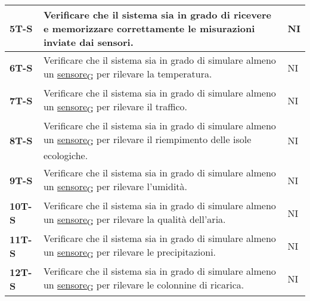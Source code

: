 \begin{longtable}{|>{\raggedright\arraybackslash}m{}|>{\raggedright\arraybackslash}m{}|>{\raggedright\arraybackslash}m{}|}
	\hline
	\textbf{5T-S}   & Verificare che il sistema sia in grado di ricevere e memorizzare correttamente le misurazioni inviate dai sensori.                                                                               & NI             \\
	\hline
	\textbf{6T-S}   & Verificare che il sistema sia in grado di simulare almeno un \href{https://7last.github.io/docs/pb/documentazione-interna/glossario\#sensore}{sensore\textsubscript{G}} per rilevare la temperatura.                                                                                                & NI             \\
	\hline
	\textbf{7T-S}   & Verificare che il sistema sia in grado di simulare almeno un \href{https://7last.github.io/docs/pb/documentazione-interna/glossario\#sensore}{sensore\textsubscript{G}} per rilevare il traffico.                                                                                                   & NI             \\
	\hline
	\textbf{8T-S}   & Verificare che il sistema sia in grado di simulare almeno un \href{https://7last.github.io/docs/pb/documentazione-interna/glossario\#sensore}{sensore\textsubscript{G}} per rilevare il riempimento delle isole ecologiche.                                                                         & NI             \\
	\hline
	\textbf{9T-S}   & Verificare che il sistema sia in grado di simulare almeno un \href{https://7last.github.io/docs/pb/documentazione-interna/glossario\#sensore}{sensore\textsubscript{G}} per rilevare l'umidità.                                                                                                     & NI             \\
	\hline
	\textbf{10T-S}  & Verificare che il sistema sia in grado di simulare almeno un \href{https://7last.github.io/docs/pb/documentazione-interna/glossario\#sensore}{sensore\textsubscript{G}} per rilevare la qualità dell'aria.                                                                                          & NI             \\
	\hline
	\textbf{11T-S}  & Verificare che il sistema sia in grado di simulare almeno un \href{https://7last.github.io/docs/pb/documentazione-interna/glossario\#sensore}{sensore\textsubscript{G}} per rilevare le precipitazioni.                                                                                             & NI             \\
	\hline
	\textbf{12T-S}  & Verificare che il sistema sia in grado di simulare almeno un \href{https://7last.github.io/docs/pb/documentazione-interna/glossario\#sensore}{sensore\textsubscript{G}} per rilevare le colonnine di ricarica.                                                                                      & NI             \\

\end{longtable}
